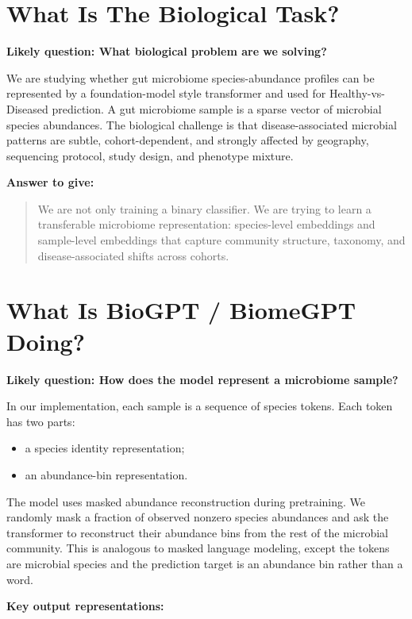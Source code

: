 \documentclass[11pt]{article}
\begin{document}
\section{What Is The Biological Task?}

\textbf{Likely question: What biological problem are we solving?}

We are studying whether gut microbiome species-abundance profiles can be represented by a
foundation-model style transformer and used for Healthy-vs-Diseased prediction. A gut
microbiome sample is a sparse vector of microbial species abundances. The biological
challenge is that disease-associated microbial patterns are subtle, cohort-dependent, and
strongly affected by geography, sequencing protocol, study design, and phenotype mixture.

\textbf{Answer to give:}

\begin{quote}
We are not only training a binary classifier. We are trying to learn a transferable
microbiome representation: species-level embeddings and sample-level embeddings that
capture community structure, taxonomy, and disease-associated shifts across cohorts.
\end{quote}

\section{What Is BioGPT / BiomeGPT Doing?}

\textbf{Likely question: How does the model represent a microbiome sample?}

In our implementation, each sample is a sequence of species tokens. Each token has two
parts:

\begin{itemize}
  \item a species identity representation;
  \item an abundance-bin representation.
\end{itemize}

The model uses masked abundance reconstruction during pretraining. We randomly mask a
fraction of observed nonzero species abundances and ask the transformer to reconstruct
their abundance bins from the rest of the microbial community. This is analogous to masked
language modeling, except the tokens are microbial species and the prediction target is an
abundance bin rather than a word.

\textbf{Key output representations:}
\end{document}
